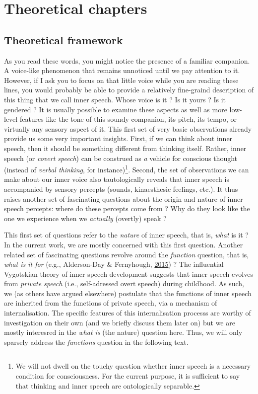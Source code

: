 \documentclass[a4paper,12pt,twoside,openright,oldfontcommands]{memoir}
\let\rmarkdownfootnote\footnote%
\def\footnote{\protect\rmarkdownfootnote}
\newcommand{\initial}[1]{
	\lettrine[lines=3,lhang=0.33,nindent=0em]{
		\color{gray}
     		{\textsc{#1}}}{}}
\begin{document}

\part{Theoretical chapters}\label{part-theoretical-chapters}

\chapter{Theoretical framework}\label{intro}

\initial{A}s you read these words, you might notice the presence of a
familiar companion. A voice-like phenomenon that remains unnoticed until
we pay attention to it. However, if I ask you to focus on that little
voice while you are reading these lines, you would probably be able to
provide a relatively fine-graind description of this thing that we call
inner speech. Whose voice is it ? Is it yours ? Is it gendered ? It is
usually possible to examine these aspects as well as more low-level
features like the tone of this soundy companion, its pitch, its tempo,
or virtually any sensory aspect of it. This first set of very basic
observations already provide us some very important insights. First, if
we can think about inner speech, then it should be something different
from thinking itself. Rather, inner speech (or \emph{covert speech}) can
be construed as \emph{a} vehicle for conscious thought (instead of
\emph{verbal thinking}, for instance)\footnote{We will not dwell on the
  touchy question whether inner speech is a necessary condition for
  consciousness. For the current purpose, it is sufficient to say that
  thinking and inner speech are ontologically separable.}. Second, the
set of observations we can make about our inner voice also
tautologically reveals that inner speech is accompanied by sensory
percepts (sounds, kinaesthesic feelings, etc.). It thus raises another
set of fascinating questions about the origin and nature of inner speech
percepts: where do these percepts come from ? Why do they look like the
one we experience when we \emph{actually} (overtly) speak ?

This first set of questions refer to the \emph{nature} of inner speech,
that is, \emph{what} is it ? In the current work, we are mostly
concerned with this first question. Another related set of fascinating
questions revolve around the \emph{function} question, that is,
\emph{what is it for} (e.g., Alderson-Day \& Fernyhough,
\protect\hyperlink{ref-alderson-day_inner_2015}{2015}) ? The influential
Vygotskian theory of inner speech development suggests that inner speech
evolves from \emph{private speech} (i.e., self-adressed overt speech)
during childhood. As such, we (as others have argued elsewhere)
postulate that the functions of inner speech are inherited from the
functions of private speech, via a mechanism of internalisation. The
specific features of this internalisation processs are worthy of
investigation on their own (and we briefly discuss them later on) but we
are mostly interesred in the \emph{what is} (the nature) question here.
Thus, we will only sparsely address the \emph{functions} question in the
following text.
\end{document}
